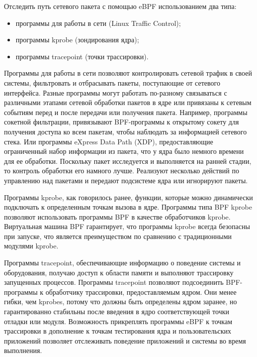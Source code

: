 Отследить путь сетевого пакета с помощью eBPF использованием два типа: 
\begin{itemize}
	\item программы для работы в сети (Linux Traffic Control);
	\item программы kprobe (зондирования ядра);
	\item программы tracepoint (точки трассировки). 
\end{itemize}

Программы для работы в сети позволяют контролировать сетевой трафик в своей системы, фильтровать и отбрасывать пакеты, поступающие от сетевого интерфейса. Разные программы могут работать по-разному связываться с различными этапами сетевой обработки пакетов в ядре или привязаны к сетевым событиям перед и после передачи или получения пакета. 
Например, программы сокетной фильтрации, привязывают BPF-программы к открытому сокету для получения доступа ко всем пакетам, чтобы наблюдать за информацией сетевого стека. 
Или программы eXpress Data Path (XDP), предоставляющие ограниченный набор информации из пакета, что у ядра было немного времени для ее обработки. Поскольку пакет исследуется и выполняется на ранней стадии, то контроль обработки его намного лучше. 
Реализуют несколько действий по управлению над пакетами и передают подсистеме ядра или игнорируют пакеты.

Программы kprobe, как говорилось ранее, функции, которые можно динамически подключать к определенным точкам вызова в ядре.
Программы типа BPF kprobe позволяют использовать программы BPF в качестве обработчиков kprobe. Виртуальная машина BPF гарантирует, что программы kprobe всегда безопасны при запуске, что является преимуществом по сравнению с традиционными модулями kprobe.

Программы tracepoint, обеспечивающие информацию о поведение системы и оборудования, получаю доступ к области памяти и выполняют трассировку запущенных процессов.
Программы tracepoint позволяют подсоединить BPF-программы к обработчику трассировки, предоставляемым ядром.
Они менее гибки, чем kprobes, потому что должны быть определены ядром заранее, но гарантированно стабильны после введения в ядро соответствующей точки отладки или модуля.
Возможность прикреплять программы eBPF к точкам трассировки в дополнение к точкам тестирования ядра и пользовательских приложений позволяет отслеживать поведение приложений и системы во время выполнения.

